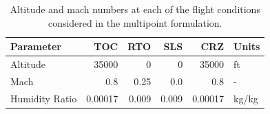 \documentclass[conf]{new-aiaa}
\begin{document}
\begin{table}[hbt!]
    \centering
    \caption{Altitude and mach numbers at each of the flight conditions considered in the multipoint formulation.
    }
    \begin{tabular}{l r r r r l}
        \hline
        Parameter      & TOC     & RTO   & SLS   & CRZ     & Units      \\
        \hline
        Altitude       & 35000   & 0     & 0     & 35000   & \si{ft}    \\
        Mach           & 0.8     & 0.25  & 0.0   & 0.8     & -          \\
        Humidity Ratio & 0.00017 & 0.009 & 0.009 & 0.00017 & \si{kg/kg} \\
        \hline
    \end{tabular}
    \label{flight_conds}
\end{table}
\end{document}
